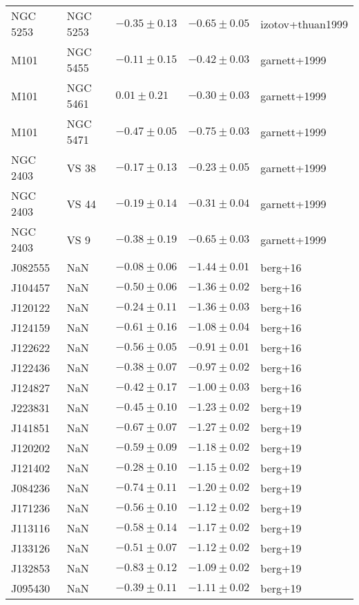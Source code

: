 \documentclass[11pt]{article}
\begin{document}
\begin{table}
\begin{longtable}{lllll}
    NGC 5253 & NGC 5253 & $-0.35 \pm 0.13$ & $-0.65 \pm 0.05$ & izotov+thuan1999 \\
    M101 & NGC 5455 & $-0.11 \pm 0.15$ & $-0.42 \pm 0.03$ & garnett+1999 \\
    M101 & NGC 5461 & $0.01 \pm 0.21$ & $-0.30 \pm 0.03$ & garnett+1999 \\
    M101 & NGC 5471 & $-0.47 \pm 0.05$ & $-0.75 \pm 0.03$ & garnett+1999 \\
    NGC 2403 & VS 38 & $-0.17 \pm 0.13$ & $-0.23 \pm 0.05$ & garnett+1999 \\
    NGC 2403 & VS 44 & $-0.19 \pm 0.14$ & $-0.31 \pm 0.04$ & garnett+1999 \\
    NGC 2403 & VS 9 & $-0.38 \pm 0.19$ & $-0.65 \pm 0.03$ & garnett+1999 \\
    J082555 & NaN & $-0.08 \pm 0.06$ & $-1.44 \pm 0.01$ & berg+16 \\
    J104457 & NaN & $-0.50 \pm 0.06$ & $-1.36 \pm 0.02$ & berg+16 \\
    J120122 & NaN & $-0.24 \pm 0.11$ & $-1.36 \pm 0.03$ & berg+16 \\
    J124159 & NaN & $-0.61 \pm 0.16$ & $-1.08 \pm 0.04$ & berg+16 \\
    J122622 & NaN & $-0.56 \pm 0.05$ & $-0.91 \pm 0.01$ & berg+16 \\
    J122436 & NaN & $-0.38 \pm 0.07$ & $-0.97 \pm 0.02$ & berg+16 \\
    J124827 & NaN & $-0.42 \pm 0.17$ & $-1.00 \pm 0.03$ & berg+16 \\
    J223831 & NaN & $-0.45 \pm 0.10$ & $-1.23 \pm 0.02$ & berg+19 \\
    J141851 & NaN & $-0.67 \pm 0.07$ & $-1.27 \pm 0.02$ & berg+19 \\
    J120202 & NaN & $-0.59 \pm 0.09$ & $-1.18 \pm 0.02$ & berg+19 \\
    J121402 & NaN & $-0.28 \pm 0.10$ & $-1.15 \pm 0.02$ & berg+19 \\
    J084236 & NaN & $-0.74 \pm 0.11$ & $-1.20 \pm 0.02$ & berg+19 \\
    J171236 & NaN & $-0.56 \pm 0.10$ & $-1.12 \pm 0.02$ & berg+19 \\
    J113116 & NaN & $-0.58 \pm 0.14$ & $-1.17 \pm 0.02$ & berg+19 \\
    J133126 & NaN & $-0.51 \pm 0.07$ & $-1.12 \pm 0.02$ & berg+19 \\
    J132853 & NaN & $-0.83 \pm 0.12$ & $-1.09 \pm 0.02$ & berg+19 \\
    J095430 & NaN & $-0.39 \pm 0.11$ & $-1.11 \pm 0.02$ & berg+19 \\

\end{longtable}
\end{table}
\end{document}
